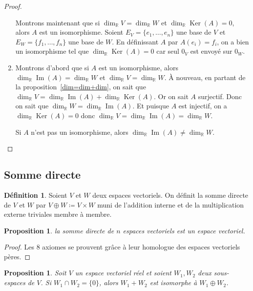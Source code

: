 \documentclass{article}
\DeclareMathOperator{\Ker}{Ker}
\DeclareMathOperator{\Imf}{Im}
\newcommand{\R}{\mathbb R}
\newtheorem{prp}[thm]{Proposition}
\theoremstyle{definition}
\newtheorem{déf}[thm]{Définition}
\theoremstyle{remark}
\begin{document}
\begin{proof}
\begin{enumerate}
			      Montrons maintenant que si $\dim_\R V = \dim_\R W$ et $\dim_\R \Ker(A) = 0$, alors $A$ est un isomorphisme. Soient $E_V = \{e_1, \dotsc, e_n\}$ une base
				  de $V$ et $E_W = \{f_1, \dotsc, f_n\}$ une base de $W$. En définissant $A$ par $A(e_i) = f_i$, on a bien un isomorphisme tel que $\dim_\R\Ker(A) = 0$
				  car seul $0_V$ est envoyé sur $0_W$.

			\item Montrons d'abord que si $A$ est un isomorphisme, alors $\dim_\R \Imf(A) = \dim_\R W$ et $\dim_\R V = \dim_\R W$. À nouveau, en partant de la
			      proposition~\ref{dim=dim+dim}, on sait que $\dim_\R V = \dim_\R \Imf(A) + \dim_\R\Ker(A)$. Or on sait $A$ surjectif. Donc on sait que
				  $\dim_\R W = \dim_\R\Imf(A)$. Et puisque $A$ est injectif, on a $\dim_\R\Ker(A) = 0$ donc $\dim_\R V = \dim_\R\Imf(A) = \dim_\R W$.

			      Si $A$ n'est pas un isomorphisme, alors $\dim_\R\Imf(A) \neq \dim_\R W$.
		\end{enumerate}
		\end{proof}
	
	\subsection{Somme directe}
		\begin{déf} Soient $V$ et $W$ deux espaces vectoriels. On définit la somme directe de $V$ et $W$ par $V \oplus W \coloneqq V \times W$ muni de l'addition interne et
		de la multiplication externe triviales membre à membre. \end{déf}

		\begin{prp} la somme directe de $n$ espaces vectoriels est un espace vectoriel. \end{prp}

		\begin{proof} Les 8 axiomes se prouvent grâce à leur homologue des espaces vectoriels pères. \end{proof}

		\begin{prp} Soit $V$ un espace vectoriel réel et soient $W_1, W_2$ deux sous-espaces de $V$. Si $W_1 \cap W_2 = \{0\}$, alors $W_1+W_2$ est isomorphe à
		$W_1 \oplus W_2$. \end{prp}
\end{document}
